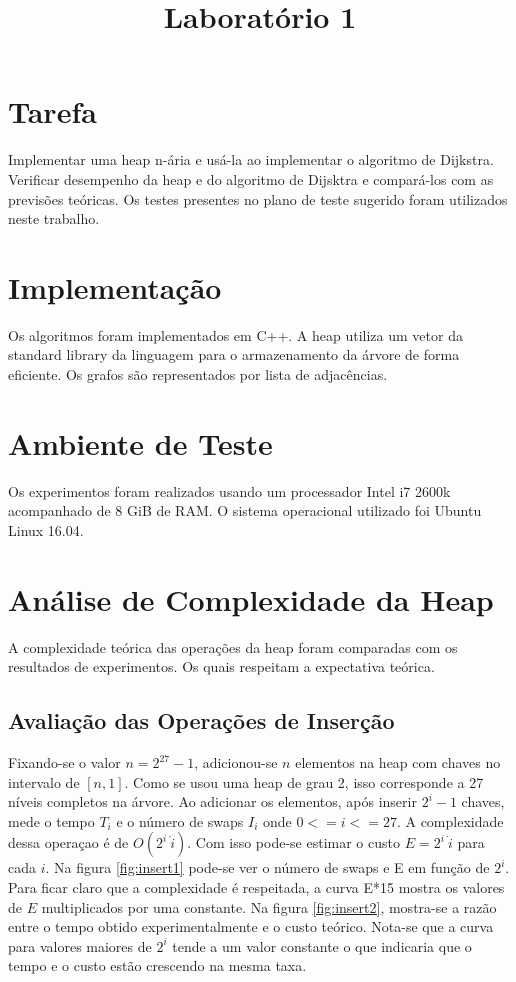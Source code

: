 \documentclass{iiufrgs}
\title{Laboratório 1}
\author{}{Thiago Bell}
\begin{document}
\maketitle

\setcounter{chapter}{1}

\section{Tarefa}
Implementar uma heap n-ária e usá-la ao implementar o algoritmo de Dijkstra. Verificar desempenho da heap e do algoritmo de Dijsktra e compará-los com as previs\~oes teóricas.
Os testes presentes no plano de teste sugerido foram utilizados neste trabalho.

\section{Implementaç\~ao}
Os algoritmos foram implementados em C++. A heap utiliza um vetor da standard library da linguagem para o armazenamento da árvore de forma eficiente. Os grafos s\~ao representados por lista de adjacências.
\section{Ambiente de Teste}
Os experimentos foram realizados usando um processador Intel i7 2600k acompanhado de 8 GiB de RAM. O sistema operacional utilizado foi Ubuntu Linux 16.04.
\section{Análise de Complexidade da Heap}
A complexidade teórica das operaç\~oes da heap foram comparadas com os resultados de experimentos. Os quais respeitam a expectativa teórica. 
\subsection{Avaliaç\~ao das Operaç\~oes de Inserç\~ao}
Fixando-se o valor $n = 2^{27}-1$, adicionou-se $n$ elementos na heap com chaves no intervalo de $[n,1]$.  Como se usou uma heap de grau 2, isso corresponde a 27 níveis completos na árvore. Ao adicionar os elementos, após inserir $2^{i}-1$ chaves, mede o tempo $T_i$ e o número de swaps $I_i$ onde $0<=i<=27$. A complexidade dessa operaçao é de $O(2^i ~ \dot i)$. Com isso pode-se estimar o custo $E = 2^i ~ \dot i$ para cada $i$. Na figura \ref{fig:insert1} pode-se ver o número de swaps e E em funç\~ao de $2^i$. Para ficar claro que a complexidade é respeitada, a curva E*15 mostra os valores de $E$ multiplicados por uma constante. Na figura \ref{fig:insert2}, mostra-se a raz\~ao entre o tempo obtido experimentalmente e o custo teórico. Nota-se que a curva para valores maiores de $2^i$ tende a um valor constante o que indicaria que o tempo e o custo est\~ao crescendo na mesma taxa.
\end{document}
